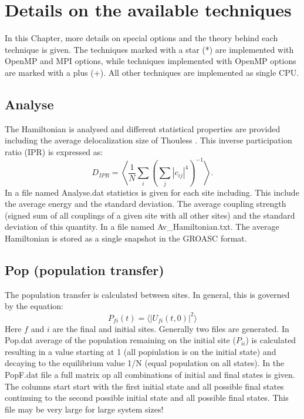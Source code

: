 \chapter{\label{chap:techniques}Details on the available techniques}
In this Chapter, more details on special options and the theory behind each technique is given. The techniques marked with a star (*) are implemented with OpenMP and MPI options, while techniques implemented with OpenMP options are marked with a plus (+). All other techniques are implemented as single CPU. 
\section{Analyse}
The Hamiltonian is analysed and different statistical properties are provided including the average delocalization size of Thouless \cite{Thouless.1974.PR.13.93}. This inverse participation ratio (IPR) is expressed as:
\begin{equation}
	D_{IPR}=\left\langle\frac{1}{N}\sum_i\left(\sum_j |c_{ij}|^{4}\right)^{-1}\right \rangle.
\end{equation}
In a file named Analyse.dat statistics is given for each site including. This include the average energy and the standard deviation. The average coupling strength (signed sum of all couplings of a given site with all other sites) and the standard deviation of this quantity.
In a file named Av\_Hamiltonian.txt. The average Hamiltonian is stored as a single snapshot in the GROASC format.
\section{Pop (population transfer)}
The population transfer is calculated between sites. In general, this is governed by the equation:
\begin{equation}
P_{fi}(t)=\langle |U_{fi}(t,0)|^2 \rangle
\end{equation}
Here $f$ and $i$ are the final and initial sites. Generally two files are generated. In Pop.dat average of the population remaining on the initial site ($P_{ii}$) is calculated resulting in a value starting at 1 (all popiulation is on the initial state) and decaying to the equilibrium value 1/N (equal population on all states). In the PopF.dat file a full matrix op all combinations of initial and final states is given. The columns start start with the first initial state and all possible final states continuing to the second possible initial state and all possible final states. This file may be very large for large system sizes!
